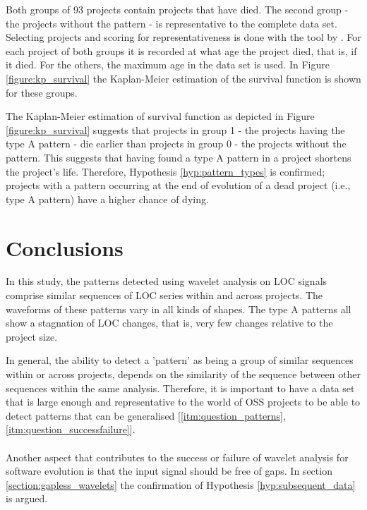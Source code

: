 Both groups of 93 projects contain projects that have died. The second group -
the projects without the pattern - is representative to the complete data set.
Selecting projects and scoring for representativeness is done with the tool by
\citet{nagappan}. For each project of both groups it is recorded at what age the
project died, that is, if it died. For the others, the maximum age in the data
set is used. In Figure \ref{figure:kp_survival} the Kaplan-Meier estimation of
the survival function is shown for these groups.



\noindent
The Kaplan-Meier estimation of survival function as depicted in Figure
\ref{figure:kp_survival} suggests that projects in group 1 - the projects
having the type A pattern - die earlier than projects in group 0 - the projects
without the pattern. This suggests that having found a type A pattern in a
project shortens the project's life. Therefore, Hypothesis
\ref{hyp:pattern_types} is confirmed; projects with a pattern occurring at the
end of evolution of a dead project (i.e., type A pattern) have a higher chance
of dying.

\section{Conclusions}


In this study, the patterns detected using wavelet analysis on LOC signals
comprise similar sequences of LOC series within and across projects. The
waveforms of these patterns vary in all kinds of shapes. The type A patterns
all show a stagnation of LOC changes, that is, very few changes relative to the
project size.

In general, the ability to detect a 'pattern' as being a group of similar
sequences within or across projects, depends on the similarity of the sequence
between other sequences within the same analysis. Therefore, it is important to
have a data set that is large enough and representative to the world of OSS
projects to be able to detect patterns that can be generalised
[\ref{itm:question_patterns}, \ref{itm:question_successfailure}].

\paragraph{}
Another aspect that contributes to the success or failure of wavelet analysis
for software evolution is that the input signal should be free of gaps. In
section \ref{section:gapless_wavelets} the confirmation of Hypothesis
\ref{hyp:subsequent_data} is argued.

